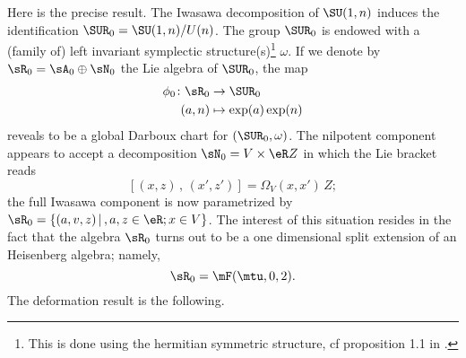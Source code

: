 Here is the precise result. The Iwasawa decomposition of $\SU(1,n)$ induces the identification $\SUR_0=\SU(1,n)/U(n)$. The group $\SUR_0$ is endowed with a (family of) left invariant symplectic structure(s)\footnote{This is done using the hermitian symmetric structure, cf proposition 1.1 in \cite{Biel-Massar}.} $\omega$.  If we denote by $\sR_0=\sA_0\oplus\sN_0$ the Lie algebra of $\SUR_0$, the map
\begin{equation}  \label{DARBOUX}
	\begin{aligned}
		\phi_0\colon \sR_0 & \to \SUR_0             \\
		(a,n)              & \mapsto \exp(a)\exp(n)
	\end{aligned}
\end{equation}
reveals to be a global Darboux chart for $(\SUR_0,\omega)$.  The nilpotent component appears to accept a decomposition $\sN_0=V\times\eR Z$ in which the Lie bracket reads
\[
	[(x,z)\,,\,(x',z')]=\Omega_V(x,x')\,Z;
\]
the full Iwasawa component is now parametrized by $\sR_0=\{(a,v,z)\,|\,,a,z\in\eR;x\in V\}$. The interest of this situation resides in the fact that the algebra $\sR_0$ turns out to be a one dimensional split extension of an Heisenberg algebra; namely,
\[
	\sR_0=\mF(\mtu,0,2).
\]
The deformation result is the following.

